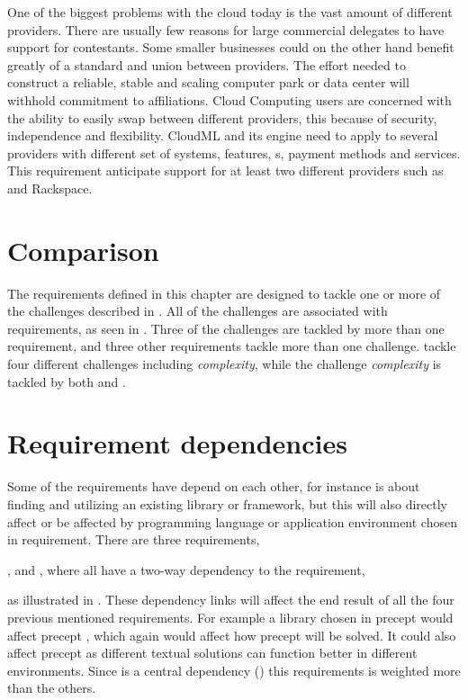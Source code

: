 One of the biggest problems with the cloud today is the vast amount of different providers. 
There are usually few reasons for large commercial delegates to have support for contestants. 
Some smaller businesses could on the other hand benefit greatly of a standard and union 
between providers.
The effort needed to construct a reliable, stable and scaling computer park or data center will 
withhold commitment to affiliations. 
Cloud Computing users are concerned with the ability to easily swap between different providers, 
this because of security, 
independence and flexibility. 
CloudML and its engine need to apply to several providers with different set of systems, 
features, s, payment methods and services. 
This requirement anticipate support for at least two different providers such as  and Rackspace.

\section{Comparison}


The requirements defined in this chapter are designed to tackle one or more of the challenges
described in .
All of the challenges are associated with requirements, as seen in .
Three of the challenges are tackled by more than one requirement, and three other requirements
tackle more than one challenge.
\eg {} tackle four different challenges including \emph{complexity},
while the challenge \emph{complexity} is tackled by both 
 and .

\section{Requirement dependencies}


Some of the requirements have depend on each other, for instance  is about finding
and utilizing an existing library or framework, but this will also directly affect or be affected by
programming language or application environment chosen in  requirement.
There are three requirements, 
\begin{ii}
  \iitem {},
  \iitem {} and
  \iitem {},
    where all have a two-way dependency to the 
  \iitem {} requirement,
\end{ii}
as illustrated in .
These dependency links will affect the end result of all the four previous mentioned requirements.
For example a library chosen in precept  would affect precept , which again would affect
how precept  will be solved. 
It could also affect precept  as different textual solutions can function better in
different environments.
Since  is a central dependency ()
this requirements is weighted more than the others.

